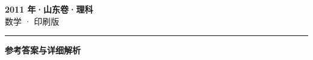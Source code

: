 \documentclass[zihao=5, a4paper]{ctexart}
\begin{document}
\begin{center}
  {\Large\bfseries 2011 年·山东卷·理科}\\[4pt]
  {\large 数学 · 印刷版}
\end{center}
\medskip
{}

\par\bigskip\hrule\bigskip
{}
\begin{center}{\large\bfseries 参考答案与详细解析}\end{center}
\smallskip

\end{document}
